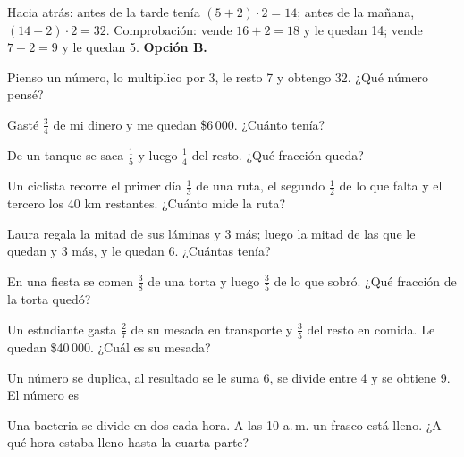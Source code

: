 \begin{retoresuelto}
Hacia atrás: antes de la tarde tenía $(5 + 2)\cdot 2 = 14$; antes de la mañana, $(14 + 2) \cdot 2 = 32$.
Comprobación: vende $16 + 2 = 18$ y le quedan 14; vende $7 + 2 = 9$ y le quedan 5. \textbf{Opción B.}
\end{retoresuelto}

\taller
{}
\begin{ejercicios}
\item Pienso un número, lo multiplico por 3, le resto 7 y obtengo 32. ¿Qué número pensé? 
\item Gasté $\tfrac34$ de mi dinero y me quedan \$6\,000. ¿Cuánto tenía? 
\item De un tanque se saca $\tfrac15$ y luego $\tfrac14$ del resto. ¿Qué fracción queda? 
\end{ejercicios}
\begin{ejercicios}
\item Un ciclista recorre el primer día $\tfrac13$ de una ruta, el segundo $\tfrac12$ de lo que falta y el tercero los 40 km restantes. ¿Cuánto mide la ruta? 
\item Laura regala la mitad de sus láminas y 3 más; luego la mitad de las que le quedan y 3 más, y le quedan 6. ¿Cuántas tenía? 
\item En una fiesta se comen $\tfrac38$ de una torta y luego $\tfrac35$ de lo que sobró. ¿Qué fracción de la torta quedó? 
\end{ejercicios}
\begin{ejercicios}
\item Un estudiante gasta $\tfrac{2}{7}$ de su mesada en transporte y $\tfrac{3}{5}$ del resto en comida. Le quedan \$40\,000. ¿Cuál es su mesada?
\item Un número se duplica, al resultado se le suma 6, se divide entre 4 y se obtiene 9. El número es
\item Una bacteria se divide en dos cada hora. A las 10 a.\,m. un frasco está lleno. ¿A qué hora estaba lleno hasta la cuarta parte?
\end{ejercicios}

